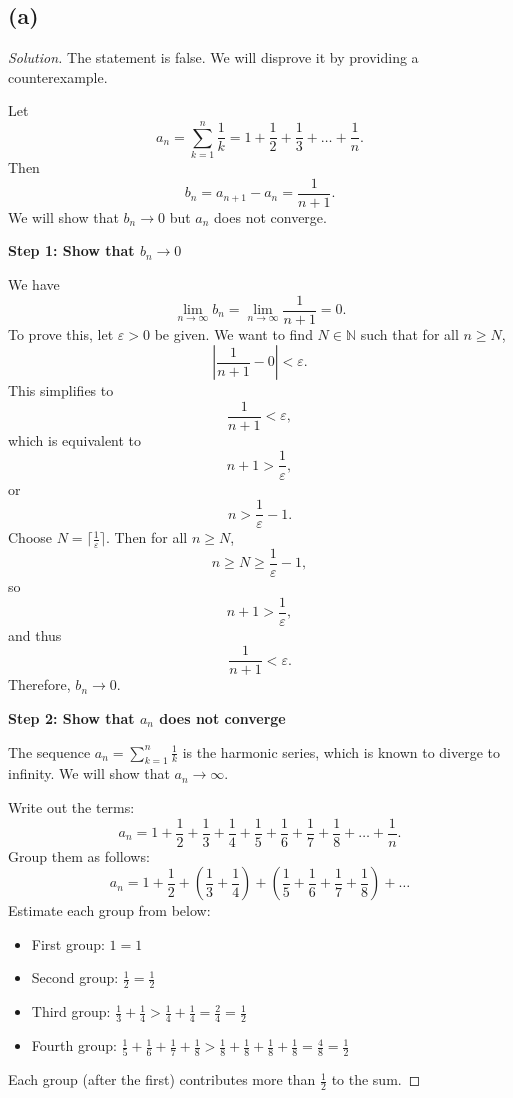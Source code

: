 \documentclass[12pt,a4paper]{article}
\theoremstyle{definition}
\theoremstyle{remark}
\newenvironment{solution}{\begin{proof}[Solution]}{\end{proof}}
\begin{document}
\subsection*{(a)}
\begin{solution}
The statement is false. We will disprove it by providing a counterexample.

Let
\[
a_n = \sum_{k=1}^n \frac{1}{k} = 1 + \frac{1}{2} + \frac{1}{3} + \dots + \frac{1}{n}.
\]
Then
\[
b_n = a_{n+1} - a_n = \frac{1}{n+1}.
\]
We will show that $b_n \to 0$ but $a_n$ does not converge.

\textbf{Step 1: Show that $b_n \to 0$}

We have
\[
\lim_{n\to\infty} b_n = \lim_{n\to\infty} \frac{1}{n+1} = 0.
\]
To prove this, let $\varepsilon > 0$ be given. We want to find $N \in \mathbb{N}$ such that for all $n \geq N$,
\[
\left|\frac{1}{n+1} - 0\right| < \varepsilon.
\]
This simplifies to
\[
\frac{1}{n+1} < \varepsilon,
\]
which is equivalent to
\[
n+1 > \frac{1}{\varepsilon},
\]
or
\[
n > \frac{1}{\varepsilon} - 1.
\]
Choose $N = \lceil \frac{1}{\varepsilon} \rceil$. Then for all $n \geq N$,
\[
n \geq N \geq \frac{1}{\varepsilon} - 1,
\]
so
\[
n+1 > \frac{1}{\varepsilon},
\]
and thus
\[
\frac{1}{n+1} < \varepsilon.
\]
Therefore, $b_n \to 0$.

\textbf{Step 2: Show that $a_n$ does not converge}

The sequence $a_n = \sum_{k=1}^n \frac{1}{k}$ is the harmonic series, which is known to diverge to infinity. We will show that $a_n \to \infty$.

Write out the terms:
\[
a_n = 1 + \frac{1}{2} + \frac{1}{3} + \frac{1}{4} + \frac{1}{5} + \frac{1}{6} + \frac{1}{7} + \frac{1}{8} + \dots + \frac{1}{n}.
\]
Group them as follows:
\[
a_n = 1 + \frac{1}{2} + \left(\frac{1}{3} + \frac{1}{4}\right) + \left(\frac{1}{5} + \frac{1}{6} + \frac{1}{7} + \frac{1}{8}\right) + \dots
\]
Estimate each group from below:
\begin{itemize}
    \item First group: $1 = 1$
    \item Second group: $\frac{1}{2} = \frac{1}{2}$
    \item Third group: $\frac{1}{3} + \frac{1}{4} > \frac{1}{4} + \frac{1}{4} = \frac{2}{4} = \frac{1}{2}$
    \item Fourth group: $\frac{1}{5} + \frac{1}{6} + \frac{1}{7} + \frac{1}{8} > \frac{1}{8} + \frac{1}{8} + \frac{1}{8} + \frac{1}{8} = \frac{4}{8} = \frac{1}{2}$
\end{itemize}
Each group (after the first) contributes more than $\frac{1}{2}$ to the sum.


\end{solution}
\end{document}
